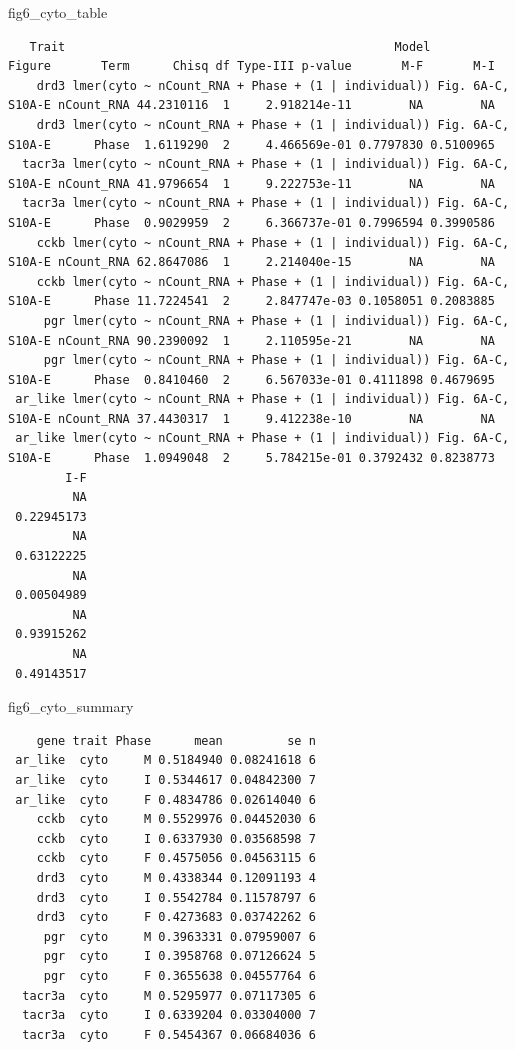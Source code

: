 \documentclass[
  landscape]{article}
\newenvironment{Shaded}{\begin{snugshade}}{\end{snugshade}}
\newcommand{\NormalTok}[1]{#1}
\begin{document}
\begin{Shaded}
\begin{Highlighting}[]
\NormalTok{fig6\_cyto\_table}
\end{Highlighting}
\end{Shaded}

\begin{verbatim}
   Trait                                              Model            Figure       Term      Chisq df Type-III p-value       M-F       M-I
    drd3 lmer(cyto ~ nCount_RNA + Phase + (1 | individual)) Fig. 6A-C, S10A-E nCount_RNA 44.2310116  1     2.918214e-11        NA        NA
    drd3 lmer(cyto ~ nCount_RNA + Phase + (1 | individual)) Fig. 6A-C, S10A-E      Phase  1.6119290  2     4.466569e-01 0.7797830 0.5100965
  tacr3a lmer(cyto ~ nCount_RNA + Phase + (1 | individual)) Fig. 6A-C, S10A-E nCount_RNA 41.9796654  1     9.222753e-11        NA        NA
  tacr3a lmer(cyto ~ nCount_RNA + Phase + (1 | individual)) Fig. 6A-C, S10A-E      Phase  0.9029959  2     6.366737e-01 0.7996594 0.3990586
    cckb lmer(cyto ~ nCount_RNA + Phase + (1 | individual)) Fig. 6A-C, S10A-E nCount_RNA 62.8647086  1     2.214040e-15        NA        NA
    cckb lmer(cyto ~ nCount_RNA + Phase + (1 | individual)) Fig. 6A-C, S10A-E      Phase 11.7224541  2     2.847747e-03 0.1058051 0.2083885
     pgr lmer(cyto ~ nCount_RNA + Phase + (1 | individual)) Fig. 6A-C, S10A-E nCount_RNA 90.2390092  1     2.110595e-21        NA        NA
     pgr lmer(cyto ~ nCount_RNA + Phase + (1 | individual)) Fig. 6A-C, S10A-E      Phase  0.8410460  2     6.567033e-01 0.4111898 0.4679695
 ar_like lmer(cyto ~ nCount_RNA + Phase + (1 | individual)) Fig. 6A-C, S10A-E nCount_RNA 37.4430317  1     9.412238e-10        NA        NA
 ar_like lmer(cyto ~ nCount_RNA + Phase + (1 | individual)) Fig. 6A-C, S10A-E      Phase  1.0949048  2     5.784215e-01 0.3792432 0.8238773
        I-F
         NA
 0.22945173
         NA
 0.63122225
         NA
 0.00504989
         NA
 0.93915262
         NA
 0.49143517
\end{verbatim}

\begin{Shaded}
\begin{Highlighting}[]
\NormalTok{fig6\_cyto\_summary}
\end{Highlighting}
\end{Shaded}

\begin{verbatim}
    gene trait Phase      mean         se n
 ar_like  cyto     M 0.5184940 0.08241618 6
 ar_like  cyto     I 0.5344617 0.04842300 7
 ar_like  cyto     F 0.4834786 0.02614040 6
    cckb  cyto     M 0.5529976 0.04452030 6
    cckb  cyto     I 0.6337930 0.03568598 7
    cckb  cyto     F 0.4575056 0.04563115 6
    drd3  cyto     M 0.4338344 0.12091193 4
    drd3  cyto     I 0.5542784 0.11578797 6
    drd3  cyto     F 0.4273683 0.03742262 6
     pgr  cyto     M 0.3963331 0.07959007 6
     pgr  cyto     I 0.3958768 0.07126624 5
     pgr  cyto     F 0.3655638 0.04557764 6
  tacr3a  cyto     M 0.5295977 0.07117305 6
  tacr3a  cyto     I 0.6339204 0.03304000 7
  tacr3a  cyto     F 0.5454367 0.06684036 6
\end{verbatim}
\end{document}
